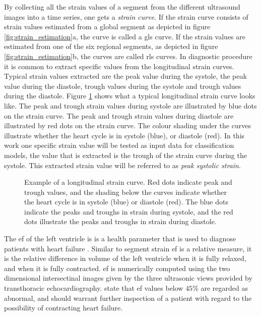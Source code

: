 By collecting all the strain values of a segment from the different ultrasound images into a time series, one gets a \textit{strain curve}. If the strain curve consists of strain values estimated from a global segment as depicted in figure \ref{fig:strain_estimation}a, the curve is called a \acrfull{gls} curve. If the strain values are estimated from one of the six regional segments, as depicted in figure \ref{fig:strain_estimation}b, the curves are called \acrfull{rls} curves. In diagnostic procedure it is common to extract specific values from the longitudinal strain curves. Typical strain values extracted are the peak value during the systole, the peak value during the diastole, trough values during the systole and trough values during the diastole. Figure \ref{fig:pss_illustration} shows what a typical longitudinal strain curve looks like. The peak and trough strain values during systole are illustrated by blue dots on the strain curve. The peak and trough strain values during diastole are illustrated by red dots on the strain curve. The colour shading under the curves illustrate whether the heart cycle is in systole (blue), or diastole (red). In this work one specific strain value will be tested as input data for classification models, the value that is extracted is the trough of the strain curve during the systole. This extracted strain value will be referred to as \textit{peak systolic strain}.

\begin{figure}[H]
    \centering
    
    \caption{Example of a longitudinal strain curve. Red dots indicate peak and trough values, and the shading below the curves indicate whether the heart cycle is in systole (blue) or diastole (red). The blue dots indicate the peaks and troughs in strain during systole, and the red dots illustrate the peaks and troughs in strain during diastole.}
    \label{fig:pss_illustration}
\end{figure}

The \acrfull{ef} of the left ventricle is is a health parameter that is used to diagnose patients with heart failure \cite{myocardial_imaging}. Similar to segment strain \acrshort{ef} is a relative measure, it is the relative difference in volume of the left ventricle when it is fully relaxed, and when it is fully contracted. \acrshort{ef} is numerically computed using the two dimensional intersectinal images given by the three ultrasonic views provided by transthoracic echocardiography. \textcite{myocardial_imaging} state that \acrshort{ef} values below $45\%$ are regarded as abnormal, and should warrant further inspection of a patient with regard to the possibility of contracting heart failure.

